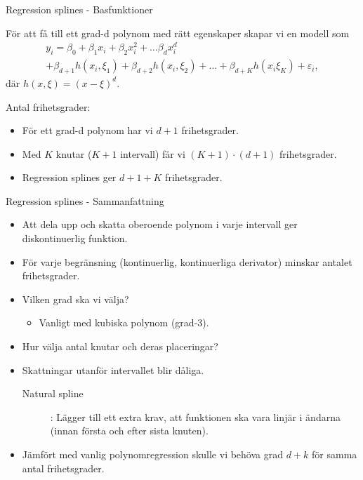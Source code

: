\documentclass[10pt,english]{beamer}
\begin{document}
\begin{frame}{Regression splines - Basfunktioner}

    För att få till ett grad-d polynom med rätt egenskaper skapar vi en modell som
    \begin{multline*}
        y_i = \beta_0 + \beta_1 x_i + \beta_2 x_i^2 + \ldots \beta_d x_i^d \\
        + \beta_{d+1} h(x_i, \xi_1) + \beta_{d+2} h(x_i, \xi_2) + \ldots + \beta_{d+K} h(x_i \xi_K) + \varepsilon_i,
    \end{multline*}
    där $h(x, \xi) = (x - \xi)^d$.

    Antal frihetsgrader:
    \begin{itemize}
        \item För ett grad-d polynom har vi $d+1$ frihetsgrader.
        \item Med $K$ knutar ($K+1$ intervall) får vi $(K+1)\cdot(d+1)$ frihetsgrader.
        \item Regression splines ger $d + 1 + K$ frihetsgrader.
    \end{itemize}
    
\end{frame}

\begin{frame}{Regression splines - Sammanfattning}

    \begin{itemize}
        \item Att dela upp och skatta oberoende polynom i varje intervall ger diskontinuerlig funktion.
        \item För varje begränsning (kontinuerlig, kontinuerliga derivator) minskar antalet frihetsgrader.
        \item Vilken grad ska vi välja?
        \begin{itemize}
            \item Vanligt med kubiska polynom (grad-3).
        \end{itemize}
        \item Hur välja antal knutar och deras placeringar?
        \item Skattningar utanför intervallet blir dåliga.
        \begin{description}
            \item[Natural spline]: Lägger till ett extra krav, att funktionen ska vara linjär i ändarna (innan första och efter sista knuten). 
        \end{description}
        \item Jämfört med vanlig polynomregression skulle vi behöva grad $d+k$ för samma antal frihetsgrader.
    \end{itemize}
    
\end{frame}
\end{document}
